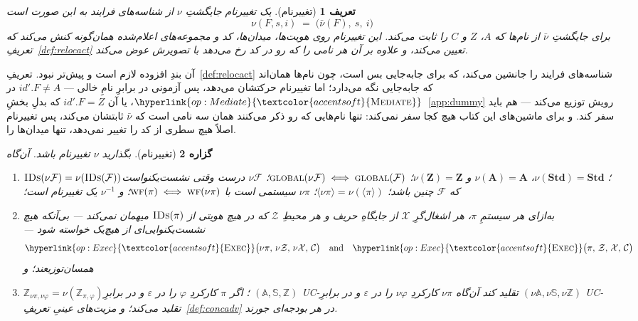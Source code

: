 \documentclass[10pt,oneside,openany]{book}
\newcommand{\Apid}{\mathbf{A}}
\newcommand{\Zpid}{\mathbf{Z}}
\newcommand{\Stdpid}{\mathbf{Std}}
\newcommand{\WF}{\op{wf}}
\newcommand{\Corr}{\mathcal{C}}
\newcommand{\F}{\mathcal{F}}
\newcommand{\Zenv}{\mathcal{Z}}
\newcommand{\Aset}{\mathbb{A}}
\newcommand{\SimSet}{\mathbb{S}}
\newcommand{\ZenvSet}{\mathbb{Z}}
\newcommand{\op}[1]{\textnormal{\textsc{#1}}}
\newcommand{\opl}[1]{\hyperlink{op:#1}{\textcolor{accentsoft}{\op{#1}}}}
\newcommand{\IDs}{\op{IDs}}
\newcommand{\id}{id}
\newcommand{\ncl}[1]{\langle #1 \rangle}
\theoremstyle{accentdef}
\newtheorem{definition}{تعریف}[chapter]
\theoremstyle{accentplain}
\newtheorem{proposition}[definition]{گزاره}
\begin{document}
\begin{definition}[تغییرنام]\label{def:rename}
یک \emph{تغییرنام} جایگشتِ $\nu$ از شناسه‌های فرایند به این صورت است
\[
  \nu(F,s,i) \;=\; \bigl(\bar\nu(F),\ s,\ i\bigr)
\]
برای جایگشتِ $\bar\nu$ از نام‌ها که $A$، $Z$ و $C$ را ثابت می‌کند. این
تغییرنام روی هویت‌ها، میدان‌ها، کد و مجموعه‌های اعلام‌شده همان‌گونه کنش
می‌کند که تعریفِ~\ref{def:relocact} تعیین می‌کند، و علاوه بر آن هر نامی را
که رو در کد رخ می‌دهد با تصویرش عوض می‌کند.
\end{definition}

آن بندِ افزوده لازم است و پیش‌تر نبود. تعریفِ~\ref{def:relocact} شناسه‌های
فرایند را جانشین می‌کند، که برای جابه‌جایی بس است، چون نام‌ها همان‌اند که
جابه‌جایی نگه می‌دارد؛ اما تغییرنام حرکتشان می‌دهد، پس آزمونی در برابرِ نامِ
خالی --- $\id'.F \neq A$ در $\opl{Mediate}$، یا آن $\id'.F = Z$ که بدلِ
بخشِ~\ref{app:dummy} رویش توزیع می‌کند --- هم باید سفر کند. و برای
ماشین‌های این کتاب هیچ کجا سفر نمی‌کند: تنها نام‌هایی که رو ذکر می‌کنند
همان سه نامی است که $\bar\nu$ ثابتشان می‌کند، پس تغییرنام اصلاً هیچ سطری از
کد را تغییر نمی‌دهد، تنها میدان‌ها را.

\begin{proposition}[تغییرنام]\label{prop:rename}
بگذارید $\nu$ تغییرنام باشد. آن‌گاه
\begin{enumerate}[label=(\roman*),leftmargin=2.2em]
  \item $\IDs(\nu\F) = \nu(\IDs(\F))$؛ $\nu(\Stdpid) = \Stdpid$، $\nu(\Apid) = \Apid$ و
        $\nu(\Zpid) = \Zpid$؛ $\op{global}(\nu\F) \iff \op{global}(\F)$؛ $\nu\F$ درست
        وقتی نشست‌یکنواست که $\F$ چنین باشد؛ $\ncl{\nu\pi} = \nu(\ncl{\pi})$؛ $\nu\pi$
        سیستمی است با $\WF(\pi) \iff \WF(\nu\pi)$؛ و $\nu^{-1}$ یک تغییرنام است؛
  \item به‌ازای هر سیستمِ $\pi$، هر اشغال‌گرِ $\mathcal{X}$ از جایگاهِ حریف و هر محیطِ
        $\Zenv$ که در هیچ هویتی از $\IDs(\pi)$ میهمان نمی‌کند --- بی‌آنکه هیچ
        نشست‌یکنوایی‌ای از هیچ‌یک خواسته شود ---
        \[
          \opl{Exec}\bigl(\nu\pi,\,\nu\Zenv,\,\nu\mathcal{X},\,\Corr\bigr)
          \quad\text{and}\quad
          \opl{Exec}\bigl(\pi,\,\Zenv,\,\mathcal{X},\,\Corr\bigr)
        \]
        همسان‌توزیعند؛ و
  \item $\ZenvSet_{\nu\pi,\nu\varphi} = \nu(\ZenvSet_{\pi,\varphi})$؛ اگر $\pi$ کارکردِ
        $\varphi$ را در $\varepsilon$ و در برابرِ $(\Aset,\SimSet,\ZenvSet)$ UC-تقلید
        کند آن‌گاه $\nu\pi$ کارکردِ $\nu\varphi$ را در $\varepsilon$ و در برابرِ
        $(\nu\Aset,\nu\SimSet,\nu\ZenvSet)$ UC-تقلید می‌کند؛ و مزیت‌های عینیِ
        تعریفِ~\ref{def:concadv} در هر بودجه‌ای جورند.
\end{enumerate}
\end{proposition}
\end{document}
